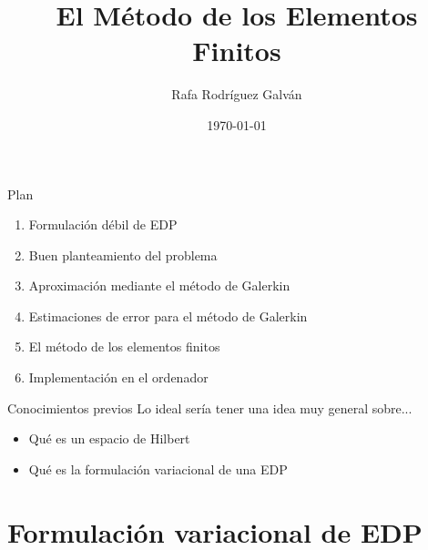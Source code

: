 \documentclass[10pt,leqno]{beamer}
\title{El Método de los Elementos Finitos}
\author{Rafa Rodríguez Galván}
\date{\today}
\begin{document}
\maketitle

\begin{frame}{Plan}

\begin{enumerate}
\setlength\itemsep{1em}
\item Formulación débil de EDP
\item Buen planteamiento del problema
\item Aproximación mediante el método de Galerkin
\item Estimaciones de error para el método de Galerkin
\item El método de los elementos finitos
\item Implementación en el ordenador
\end{enumerate}
\end{frame}


\begin{frame}{Conocimientos previos}
  Lo ideal sería tener una idea muy general sobre...
  \begin{itemize}
  \item Qué es un espacio de Hilbert
  \item Qué es la formulación variacional de una EDP
  \end{itemize}
\end{frame}

\section{Formulación variacional de EDP}
\end{document}
